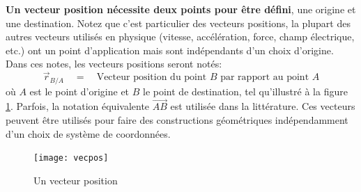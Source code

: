 
\textbf{Un vecteur position nécessite deux points pour être défini}, une origine et une destination. Notez que c'est particulier des vecteurs positions, la plupart des autres vecteurs utilisés en physique (vitesse, accélération, force, champ électrique, etc.) ont un point d'application mais sont indépendants d'un choix d’origine. Dans ces notes, les vecteurs positions seront notés:
\begin{equation}
\vec{r}_{B/A}  \quad =  \quad \text{Vecteur position du point $B$ par rapport au point $A$}
\end{equation} 
où $A$ est le point d'origine et $B$ le point de destination, tel qu'illustré à la figure \ref{fig:vecpos}. Parfois, la notation équivalente $\vec{AB}$ est utilisée dans la littérature. Ces vecteurs  peuvent être utilisés pour faire des constructions géométriques indépendamment d'un choix de système de coordonnées. 
%
\begin{figure}[htb]
        \centering
				\texttt{[image: vecpos]}
				\caption{Un vecteur position}
				\label{fig:vecpos}
\end{figure}
%

